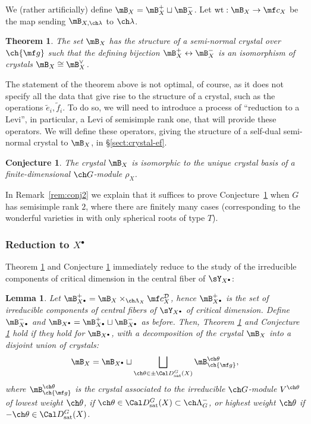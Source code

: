 \documentclass[final]{amsart}
\newtheorem{thm}[subsubsection]{Theorem}
\newtheorem{lem}[subsubsection]{Lemma}
\newtheorem{conj}[subsubsection]{Conjecture}
\theoremstyle{remark}
\theoremstyle{definition}
\numberwithin{equation}{section}
\begin{document}
We (rather artificially) define $\mB_{X} = 
\mB_{X}^+ \sqcup \mB_{X}^-$. Let $\mathrm{wt}:\mB_{X} \to \mf c_X$ be the map sending $\mB_{X,\ch\lambda}$ to $\ch\lambda$.


\begin{thm} \label{thm:crystal} 
The set $\mB_{X}$ has the structure of a semi-normal crystal over 
$\ch{\mf g}$  such that the defining bijection $\mB_{X}^+ \leftrightarrow \mB_{X}^-$ is an isomorphism of crystals $\mB_{X} \cong \mB_{X}^\vee$. 
\end{thm}


The statement of the theorem above is not optimal, of course, as it does not specify all the data that give rise to the structure of a crystal, such as the operations $\tilde e_i,\tilde f_i$. To do so, we will need to introduce a process of ``reduction to a Levi'', in particular, a Levi of semisimple rank one, that will provide these operators. We will define these operators, giving the structure of a self-dual semi-normal crystal to $\mB_X$, in \S\ref{sect:crystal-ef}. 

\begin{conj} \label{conj:crystal}
The crystal $\mB_{X}$ is isomorphic to the unique crystal basis 
of a finite-dimensional $\ch G$-module $\rho_X$. 
\end{conj} 

In Remark~\ref{rem:conj2} we explain that it suffices to prove Conjecture~\ref{conj:crystal}
when $G$ has semisimple rank $2$, where there are finitely many cases (corresponding
to the wonderful varieties in \cite{Wasserman} with only spherical roots of type $T$).  


\subsubsection{Reduction to $X^\bullet$}

Theorem \ref{thm:crystal} and Conjecture \ref{conj:crystal} immediately reduce to the study of the irreducible components of critical dimension in the central fiber of $\sY_{X^\bullet}$:


\begin{lem}\label{lem:reduction-Xbullet}
 Let $\mB_{X^\bullet}^+ = \mB_X \times_{\ch\Lambda_X} \mf c_X^{\mathcal D}$, hence $\mB_{X^\bullet}^+$ is the set of irreducible components of central fibers of $\sY_{X^\bullet}$ of critical dimension. Define $\mB_{X^\bullet}^-$ and $\mB_{X^\bullet} = \mB_{X^\bullet}^+ \sqcup \mB_{X^\bullet}^-$ as before. Then, Theorem \ref{thm:crystal} and Conjecture \ref{conj:crystal} hold if they hold for $\mB_{X^\bullet}$, with a decomposition of the crystal $\mB_X$ into a disjoint union of crystals:
\begin{equation}
\label{eq:crystaldecomp}
\mB_X =  \mB_{X^\bullet} \sqcup \bigsqcup_{\ch\theta \in \pm \Cal D^G_{\mathrm{sat}}(X)} \mB^{\ch\theta}_{\ch{\mf g}},
\end{equation}
where $\mB^{\ch\theta}_{\ch{\mf g}}$ is the crystal 
associated to the irreducible
$\ch G$-module $V^{\ch\theta}$ of lowest weight $\ch\theta$, if $\ch\theta \in \Cal D^G_{\mathrm{sat}}(X) \subset \ch\Lambda_G^-$, or highest weight $\ch\theta$ if $-\ch\theta \in \Cal D^G_{\mathrm{sat}}(X)$.
\end{lem}
\end{document}
